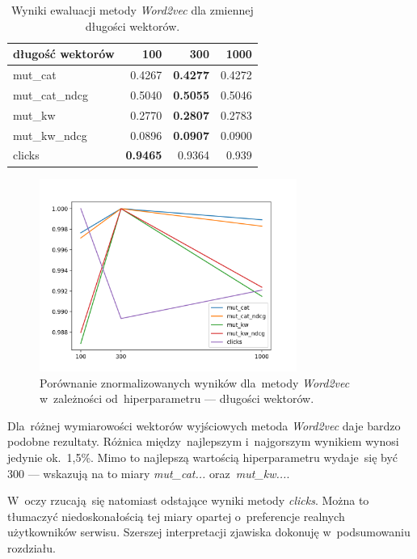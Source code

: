 \documentclass[pl]{minipw} %
\begin{document}
\begin{table}[H]
	\centering
	\begin{tabular}{lrrr}
		\hline
		długość wektorów &       100 &       300 &      1000 \\
		\hline
		mut\_cat      & 0.4267 & \textbf{0.4277} & 0.4272 \\
		mut\_cat\_ndcg & 0.5040  & \textbf{0.5055} & 0.5046 \\
		mut\_kw       & 0.2770  & \textbf{0.2807} & 0.2783 \\
		mut\_kw\_ndcg  & 0.0896 & \textbf{0.0907} & 0.0900   \\
		clicks       & \textbf{0.9465} & 0.9364 & 0.939  \\
		\hline
	\end{tabular}
	\caption{Wyniki ewaluacji metody \textit{Word2vec} dla zmiennej długości wektorów.}
\end{table}

\begin{figure}[H]
	\centering
	\includegraphics[width=0.75\textwidth]{img/results/w2v_ctr.png}
	\caption{Porównanie znormalizowanych wyników dla~metody \textit{Word2vec} w~zależności od~hiperparametru --- długości wektorów.}
\end{figure}

Dla~różnej wymiarowości wektorów wyjściowych metoda \textit{Word2vec} daje bardzo podobne rezultaty. Różnica między~najlepszym i~najgorszym wynikiem wynosi jedynie ok.~1,5\%. Mimo to najlepszą wartością hiperparametru wydaje~się być 300 --- wskazują na to miary \textit{mut\_cat...} oraz~\textit{mut\_kw...}.

W~oczy rzucają~się natomiast odstające wyniki metody \textit{clicks}. Można to tłumaczyć niedoskonałością tej miary opartej o~preferencje realnych użytkowników serwisu. Szerszej interpretacji zjawiska dokonuję w~podsumowaniu rozdziału.
\end{document}

